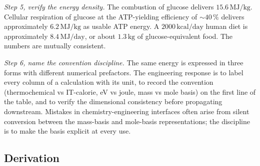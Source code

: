 \begin{exercise}
\textit{Step 5, verify the energy density.} The combustion of glucose
delivers $15.6 \,\text{MJ/kg}$. Cellular respiration of glucose at the
ATP-yielding efficiency of $\sim 40\,\%$ delivers approximately
$6.2 \,\text{MJ/kg}$ as usable ATP energy. A $2000 \,\text{kcal}/
\text{day}$ human diet is approximately $8.4 \,\text{MJ/day}$, or
about $1.3 \,\text{kg}$ of glucose-equivalent food. The numbers are
mutually consistent.

\textit{Step 6, name the convention discipline.} The same energy is
expressed in three forms with different numerical prefactors. The
engineering response is to label every column of a calculation with
its unit, to record the convention (thermochemical vs IT-calorie, eV
vs joule, mass vs mole basis) on the first line of the table, and to
verify the dimensional consistency before propagating downstream.
Mistakes in chemistry-engineering interfaces often arise from
silent conversion between the mass-basis and mole-basis
representations; the discipline is to make the basis explicit at
every use.
\end{exercise}

\subsection*{Derivation}

